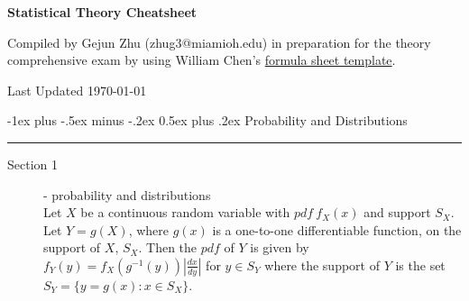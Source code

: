 \documentclass[10pt,landscape]{article}
\makeatletter
\renewcommand{\section}{\@startsection{section}{1}{0mm}%
                                {-1ex plus -.5ex minus -.2ex}%
                                {0.5ex plus .2ex}%
                                {\normalfont\large\bfseries}}
\makeatother
\begin{document}
\raggedright
\footnotesize
\begin{multicols}{3}


\setlength{\premulticols}{1pt}
\setlength{\postmulticols}{1pt}
\setlength{\multicolsep}{1pt}
\setlength{\columnsep}{2pt}


\begin{center}
     \Large{\textbf{Statistical Theory Cheatsheet}} \\
\end{center}


\scriptsize

Compiled by Gejun Zhu (zhug3@miamioh.edu) in preparation for the theory comprehensive exam by using William Chen's \href{http://wzchen.com/probability-cheatsheet}{formula sheet template}. 

\begin{center}
    Last Updated \today
\end{center}




%

\section{Probability and Distributions} \smallskip \hrule height 1pt \smallskip
\begin{description}
	\item[Section 1] - probability and distributions \\
	Let $X$ be a continuous random variable with $pdf\ f_X(x)$ and support $S_X$. Let $Y=g(X)$, where $g(x)$ is a one-to-one differentiable function, on the support of $X$, $S_X$. Then the $pdf$ of $Y$ is given by $f_Y(y) = f_X(g^{-1}(y)) |\frac{dx}{dy}|$ for $y \in S_Y$ where the support of $Y$ is the set $S_Y = \{y = g(x): x\in S_X\}$. \\



\end{description}
\end{multicols}
\end{document}
